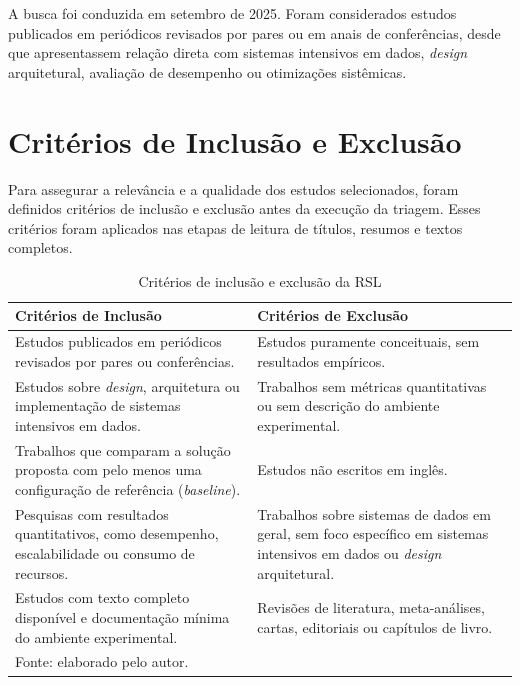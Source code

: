 A busca foi conduzida em setembro de 2025. Foram considerados estudos publicados em periódicos revisados por pares ou em anais de conferências, desde que apresentassem relação direta com sistemas intensivos em dados, \textit{design} arquitetural, avaliação de desempenho ou otimizações sistêmicas.

\section{Critérios de Inclusão e Exclusão}
\label{sec:rsl-criterios}

Para assegurar a relevância e a qualidade dos estudos selecionados, foram definidos critérios de inclusão e exclusão antes da execução da triagem. Esses critérios foram aplicados nas etapas de leitura de títulos, resumos e textos completos.

\begin{table}[htbp]
\centering
\caption{Critérios de inclusão e exclusão da RSL}
\label{tab:criterios-rsl}
\footnotesize
\setlength{\tabcolsep}{6pt}
\renewcommand{\arraystretch}{1.3}
\begin{tabular}{p{6.2cm} p{6.2cm}}
\toprule
\textbf{Critérios de Inclusão} & \textbf{Critérios de Exclusão} \\ 
\midrule
Estudos publicados em periódicos revisados por pares ou conferências. & Estudos puramente conceituais, sem resultados empíricos. \\ 
Estudos sobre \textit{design}, arquitetura ou implementação de sistemas intensivos em dados. & Trabalhos sem métricas quantitativas ou sem descrição do ambiente experimental. \\ 
Trabalhos que comparam a solução proposta com pelo menos uma configuração de referência (\textit{baseline}). & Estudos não escritos em inglês. \\ 
Pesquisas com resultados quantitativos, como desempenho, escalabilidade ou consumo de recursos. & Trabalhos sobre sistemas de dados em geral, sem foco específico em sistemas intensivos em dados ou \textit{design} arquitetural. \\ 
Estudos com texto completo disponível e documentação mínima do ambiente experimental. & Revisões de literatura, meta-análises, cartas, editoriais ou capítulos de livro. \\ 
\bottomrule
\multicolumn{2}{l}{\footnotesize Fonte: elaborado pelo autor.}
\end{tabular}
\end{table}

